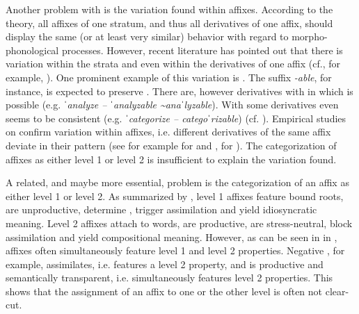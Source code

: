 Another problem with  is the variation found within affixes. According to the theory, all affixes of one stratum, and thus all derivatives of one affix, should display the same (or at least very similar) behavior with regard to morpho-phonological processes. However, recent literature has pointed out that there is variation within the strata and even within the derivatives of one affix (cf., for example, \citealt{Raffelsiefen.1999,Bauer.2013, Plag.2014, BermudezOtero.2017}).  One prominent example of this variation is . The suffix \textit{-able}, for instance, is expected to preserve . There are, however derivatives with  in which  is possible (e.g. \textit{ˈanalyze -- ˈanalyzable \textasciitilde anaˈlyzable}). With some derivatives  even seems to  be consistent (e.g. \textit{ˈcategorize -- categoˈrizable}) (cf. \citealt[213f.]{Plag.2014}). Empirical studies on  confirm variation within affixes, i.e. different derivatives of the same affix deviate in their  pattern (see for example \citealt{Collie.2008} for  and , \citealt{Sanz.2017} for ). The categorization of affixes as either level 1 or level 2 is insufficient to explain the variation found. 

A related, and maybe more essential, problem is the categorization of an affix as either level 1 or level 2. As summarized by \citet[134]{Raffelsiefen.1999}, level 1 affixes feature bound roots, are unproductive, determine , trigger assimilation and yield idiosyncratic meaning. Level 2 affixes attach to words, are productive, are stress-neutral, block assimilation and yield compositional meaning. However, as can be seen in  in , affixes often simultaneously feature level 1 and level 2 properties. Negative , for example, assimilates, i.e. features a level 2 property, and is productive and semantically transparent, i.e. simultaneously features level 2 properties. This shows that the assignment of an affix to one or the other level is often not clear-cut. 

